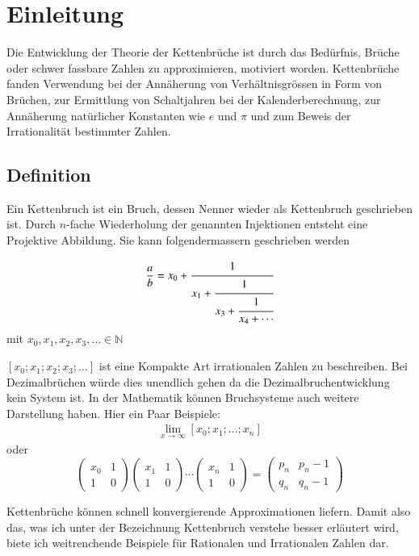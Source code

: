 %
%
%
\section{Einleitung\label{kettenbruch:section:einleitung}}
Die Entwicklung der Theorie der Kettenbrüche ist durch das Bedürfnis,
Brüche oder schwer fassbare Zahlen zu approximieren, motiviert
worden. Kettenbrüche fanden Verwendung bei der Annäherung von
Verhältnisgrössen in Form von Brüchen, zur Ermittlung von Schaltjahren
bei der Kalenderberechnung, zur Annäherung natürlicher Konstanten
wie $e$ und $\pi$ und zum Beweis der Irrationalität bestimmter
Zahlen.

\subsection{Definition\label{kettenbruch:section:1s}}
Ein Kettenbruch ist ein Bruch, dessen Nenner wieder als Kettenbruch
geschrieben ist.
Durch $n$-fache Wiederholung der genannten Injektionen entsteht
eine Projektive Abbildung.
Sie kann folgendermassern geschrieben werden

\begin{align*}
\frac{a}{b}=x_0+\cfrac{1}{x_1+\cfrac{1}{x_3+\cfrac{1}{x_4+\cdots}}}
\end{align*}
mit $x_0,x_1,x_2,x_3, \dots \in \mathbb{N}$


$[x_0;x_1;x_2;x_3;\dots]$ ist eine Kompakte Art irrationalen Zahlen
zu beschreiben. Bei Dezimalbrüchen würde dies unendlich gehen da
die Dezimalbruchentwicklung kein System ist.
In der Mathematik können Bruchsysteme auch weitere Darstellung haben. 
Hier ein Paar Beispiele:
\begin{align*}
\lim_{x\to\infty} [x_0;x_1;...;x_n]
\end{align*}  
oder
\begin{equation*}
	\begin{pmatrix}
		x_0&	1\\
		1  &	0
	\end{pmatrix}
	\begin{pmatrix}
		x_1&	1\\
		1  &	0
	\end{pmatrix}
	\cdots
	\begin{pmatrix}
		x_n&	1\\
		1  &	0
	\end{pmatrix}
	=\begin{pmatrix}
		p_n&	p_n-1\\
		q_n&	q_n-1
	\end{pmatrix}
\end{equation*}

Kettenbrüche können schnell konvergierende Approximationen liefern.
Damit also das, was ich unter der Bezeichnung Kettenbruch verstehe
besser erläutert wird, biete ich weitrenchende Beispiele für
Rationalen und Irrationalen Zahlen dar.
